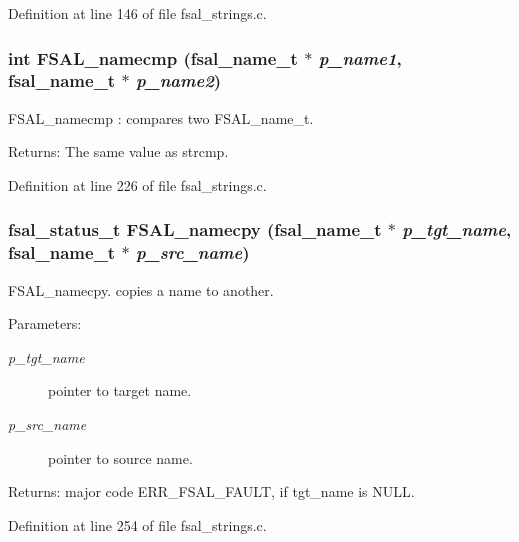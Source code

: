 Definition at line 146 of file fsal\_\-strings.c.
\subsubsection[{FSAL\_\-namecmp}]{\setlength{\rightskip}{0pt plus 5cm}int FSAL\_\-namecmp (fsal\_\-name\_\-t $\ast$ {\em p\_\-name1}, \/  fsal\_\-name\_\-t $\ast$ {\em p\_\-name2})}\label{group__FSALNameFunctions_g65950d02300f232113af9a073f86dd84}


FSAL\_\-namecmp : compares two FSAL\_\-name\_\-t.

\begin{Desc}
\item[Returns:]The same value as strcmp. \end{Desc}


Definition at line 226 of file fsal\_\-strings.c.
\subsubsection[{FSAL\_\-namecpy}]{\setlength{\rightskip}{0pt plus 5cm}fsal\_\-status\_\-t FSAL\_\-namecpy (fsal\_\-name\_\-t $\ast$ {\em p\_\-tgt\_\-name}, \/  fsal\_\-name\_\-t $\ast$ {\em p\_\-src\_\-name})}\label{group__FSALNameFunctions_gb88a56ced82037a6ab91c312993a501a}


FSAL\_\-namecpy. copies a name to another.

\begin{Desc}
\item[Parameters:]
\begin{description}
\item[{\em p\_\-tgt\_\-name}]pointer to target name. \item[{\em p\_\-src\_\-name}]pointer to source name. \end{description}
\end{Desc}
\begin{Desc}
\item[Returns:]major code ERR\_\-FSAL\_\-FAULT, if tgt\_\-name is NULL. \end{Desc}


Definition at line 254 of file fsal\_\-strings.c.
